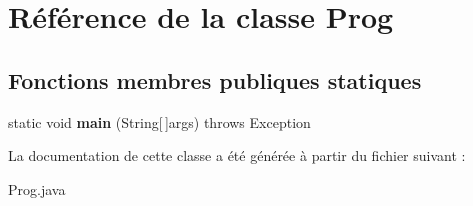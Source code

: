 \hypertarget{classProg}{\section{Référence de la classe Prog}
\label{classProg}
}
\subsection*{Fonctions membres publiques statiques}
\begin{DoxyCompactItemize}
\item 
\hypertarget{classProg_a6a74608deae3c0733cc81cd5338dd002}{static void {\bfseries main} (String\mbox{[}$\,$\mbox{]}args)  throws Exception }\label{classProg_a6a74608deae3c0733cc81cd5338dd002}

\end{DoxyCompactItemize}


La documentation de cette classe a été générée à partir du fichier suivant \+:\begin{DoxyCompactItemize}
\item 
Prog.\+java\end{DoxyCompactItemize}
